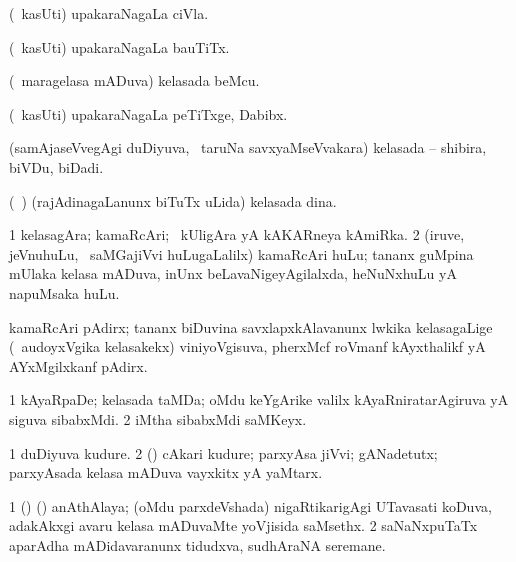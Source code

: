 \bentry
{} 
\gl{\nA}
\expl{}
\bmng
(\kanmu\ kasUti) upakaraNagaLa ciVla. 
\emng
\eentry

\bentry 
{} 
\gl{\nA}
\expl{}
\bmng
(\kanmu\ kasUti) upakaraNagaLa bauTiTx. 
\emng
\eentry

\bentry
{} 
\gl{\nA}
\expl{}
\bmng
(\kanmu\ maragelasa mADuva) kelasada beMcu. 
\emng
\eentry

\bentry
{} 
\gl{\nA}
\expl{}
\bmng
(\kanmu\ kasUti) upakaraNagaLa peTiTxge, Dabibx. 
\emng
\eentry

\bentry
{} 
\gl{\nA}
\expl{}
\bmng
(samAjaseVvegAgi duDiyuva, \kanmu\ taruNa savxyaMseVvakara) kelasada -- shibira, biVDu, biDadi. 
\emng
\eentry

\bentry
{} 
\gl{\nA}
\expl{}
\bmng
(\kanmu\ \ame) (rajAdinagaLanunx biTuTx uLida) kelasada dina. 
\emng
\eentry

\bentry
{} 
\gl{\nA}
\expl{}
\bmng
\bnum
\num{1} kelasagAra; kamaRcAri; \kanmu\ kUligAra yA kAKARneya kAmiRka. 
\num{2} (iruve, jeVnuhuLu, \mo\ saMGajiVvi huLugaLalilx) kamaRcAri huLu; tananx guMpina mUlaka kelasa mADuva, inUnx beLavaNigeyAgilalxda, heNuNxhuLu yA napuMsaka huLu. 
\enum
\emng
\eentry

\bentry 
{} 
\gl{\nA}
\expl{}
\bmng
kamaRcAri pAdirx; tananx biDuvina savxlapxkAlavanunx lwkika kelasagaLige (\kanmu\ audoyxVgika kelasakekx) viniyoVgisuva, pherxMcf roVmanf kAyxthalikf yA AYxMgilxkanf pAdirx. 
\emng
\eentry

\bentry
{} 
\gl{\nA}
\expl{}
\bmng
\bnum
\num{1} kAyaRpaDe; kelasada taMDa; oMdu keYgArike \mo valilx kAyaRniratarAgiruva yA siguva sibabxMdi. 
\num{2} iMtha sibabxMdi saMKeyx. 
\enum
\emng
\eentry

\bentry
{} 
\gl{\nA}
\expl{}
\bmng
\bnum
\num{1} duDiyuva kudure. 
\num{2} (\rUpa) cAkari kudure; parxyAsa jiVvi; gANadetutx; parxyAsada kelasa mADuva vayxkitx yA yaMtarx. 
\enum
\emng
\eentry

\bentry
{} 
\gl{\nA}
\expl{}
\bmng
% 
\bnum
\num{1} (\birx) (\ca) anAthAlaya; (oMdu parxdeVshada) nigaRtikarigAgi UTavasati koDuva, adakAkxgi avaru kelasa mADuvaMte yoVjisida saMsethx. 
\num{2} saNaNxpuTaTx aparAdha mADidavaranunx tidudxva, sudhAraNA seremane. 
\enum
\emng
\eentry

